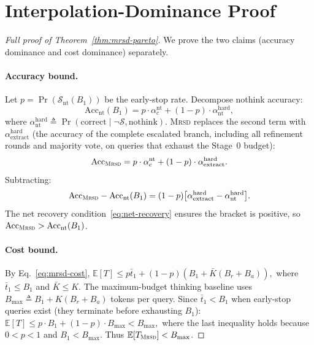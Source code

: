 \section{\method{} Interpolation-Dominance Proof}
\label{app:town-proof}

\begin{proof}[Full proof of Theorem~\ref{thm:mrsd-pareto}]
We prove the two claims (accuracy dominance and cost dominance)
separately.

\paragraph{Accuracy bound.}
Let $p = \Pr(\mathcal{S}_{\mathrm{nt}}(B_1))$ be the early-stop rate.
Decompose nothink accuracy:
$$\mathrm{Acc}_{\mathrm{nt}}(B_1) = p \cdot \alpha_c^{\mathrm{nt}}
  + (1-p) \cdot \alpha_{\mathrm{nt}}^{\mathrm{hard}},$$
where $\alpha_{\mathrm{nt}}^{\mathrm{hard}} \triangleq
\Pr(\mathrm{correct} \mid \neg\mathcal{S}, \mathrm{nothink})$.
\textsc{Mrsd} replaces the second term with
$\alpha_{\mathrm{extract}}^{\mathrm{hard}}$
(the accuracy of the complete escalated branch, including
all refinement rounds and majority vote, on queries that
exhaust the Stage~0 budget):
$$\mathrm{Acc}_{\textsc{Mrsd}} = p \cdot \alpha_c^{\mathrm{nt}}
  + (1-p) \cdot \alpha_{\mathrm{extract}}^{\mathrm{hard}}.$$
Subtracting:
\begin{equation}
\mathrm{Acc}_{\textsc{Mrsd}} - \mathrm{Acc}_{\mathrm{nt}}(B_1)
= (1-p)\bigl[\alpha_{\mathrm{extract}}^{\mathrm{hard}}
  - \alpha_{\mathrm{nt}}^{\mathrm{hard}}\bigr].
\label{eq:town-gain-decomp}
\end{equation}
The net recovery condition~\eqref{eq:net-recovery} ensures the bracket
is positive, so $\mathrm{Acc}_{\textsc{Mrsd}} > \mathrm{Acc}_{\mathrm{nt}}(B_1)$.

\paragraph{Cost bound.}
By Eq.~\eqref{eq:mrsd-cost},
$\mathbb{E}[T] \le p \bar{t}_1 + (1-p)(B_1 + \bar{K}(B_r + B_a)),$
where $\bar{t}_1 \le B_1$ and $\bar{K} \le K$.
The maximum-budget thinking baseline uses $B_{\max} \triangleq B_1 + K(B_r + B_a)$
tokens per query.
Since $\bar{t}_1 < B_1$ when early-stop queries exist
(they terminate before exhausting $B_1$):
$\mathbb{E}[T] \le p \cdot B_1 + (1-p) \cdot B_{\max} < B_{\max},$
where the last inequality holds because $0 < p < 1$ and $B_1 < B_{\max}$.
Thus $\mathbb{E}[T_{\textsc{Mrsd}}] < B_{\max}$.


\end{proof}
